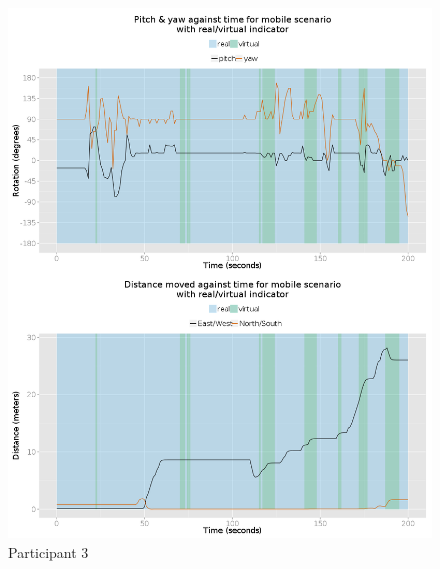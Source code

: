 \begin{figure}[h]
	\begin{center}
		\includegraphics[width=\linewidth]{images/25072014_1400_2up.png}
		\caption{Participant 3}
		\label{participant_3_2up}
	\end{center}
\end{figure}


